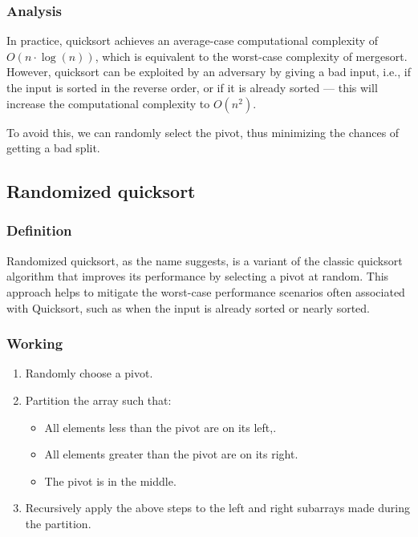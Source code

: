         \subsubsection*{Analysis}
            In practice, quicksort achieves an average-case computational complexity of \(O(n \cdot \log(n))\), which is equivalent to the worst-case complexity of mergesort. However, quicksort can be exploited by an adversary by giving a bad input, i.e., if the input is sorted in the reverse order, or if it is already sorted --- this will increase the computational complexity to \(O(n^2)\).

            To avoid this, we can randomly select the pivot, thus minimizing the chances of getting a bad split.

    \subsection*{Randomized quicksort}
        \subsubsection*{Definition}
            Randomized quicksort, as the name suggests, is a variant of the classic quicksort algorithm that improves its performance by selecting a pivot at random. This approach helps to mitigate the worst-case performance scenarios often associated with Quicksort, such as when the input is already sorted or nearly sorted.

        \subsubsection*{Working}
            \begin{enumerate}
                \item Randomly choose a pivot.
                \item Partition the array such that:
                \begin{itemize}
                    \item All elements less than the pivot are on its left,.
                    \item All elements greater than the pivot are on its right.
                    \item The pivot is in the middle.
                \end{itemize}
                \item Recursively apply the above steps to the left and right subarrays made during the partition.
            \end{enumerate}

